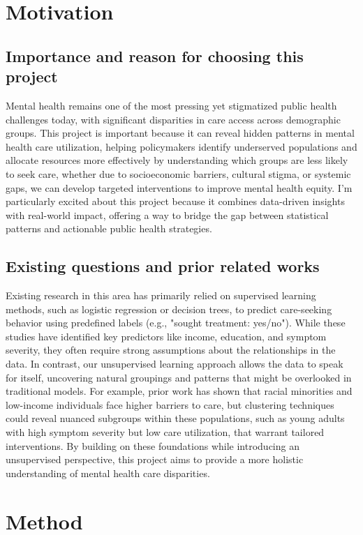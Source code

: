 \documentclass{article}
\begin{document}
\section{Motivation}
\subsection{Importance and reason for choosing this project}

Mental health remains one of the most pressing yet stigmatized public health challenges today, with significant disparities in care access across demographic groups. This project is important because it can reveal hidden patterns in mental health care utilization, helping policymakers identify underserved populations and allocate resources more effectively by understanding which groups are less likely to seek care, whether due to socioeconomic barriers, cultural stigma, or systemic gaps, we can develop targeted interventions to improve mental health equity. I’m particularly excited about this project because it combines data-driven insights with real-world impact, offering a way to bridge the gap between statistical patterns and actionable public health strategies.

\subsection{Existing questions and prior related works}
Existing research in this area has primarily relied on supervised learning methods, such as logistic regression or decision trees, to predict care-seeking behavior using predefined labels (e.g., "sought treatment: yes/no"). While these studies have identified key predictors like income, education, and symptom severity, they often require strong assumptions about the relationships in the data. In contrast, our unsupervised learning approach allows the data to speak for itself, uncovering natural groupings and patterns that might be overlooked in traditional models. For example, prior work has shown that racial minorities and low-income individuals face higher barriers to care, but clustering techniques could reveal nuanced subgroups within these populations, such as young adults with high symptom severity but low care utilization, that warrant tailored interventions. By building on these foundations while introducing an unsupervised perspective, this project aims to provide a more holistic understanding of mental health care disparities.

\section{Method}
\end{document}
